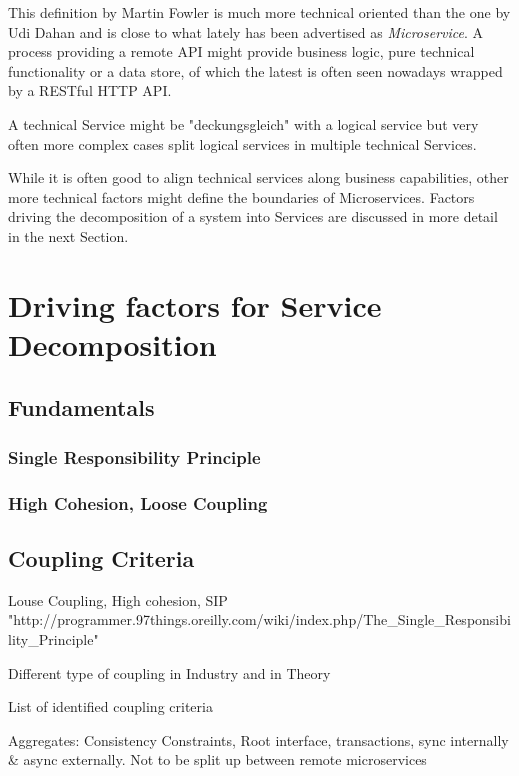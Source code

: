 \documentclass[hsr-ba,english]{hgbthesis}
\begin{document}
This definition by Martin Fowler is much more technical oriented than the one by Udi Dahan and is close to what  lately has been advertised as \textit{Microservice}. A process providing a remote API might provide business logic, pure technical functionality or a data store, of which the latest is often seen nowadays wrapped by a RESTful HTTP API.

A technical Service might be "deckungsgleich" with a logical service but very often more complex cases split logical services in multiple technical Services. 

While it is often good to align technical services along business capabilities, other more technical factors might define the boundaries of Microservices. Factors driving the decomposition of a system into Services are discussed in more detail in the next Section.

\section{Driving factors for Service Decomposition}

\subsection{Fundamentals}

\subsubsection{Single Responsibility Principle}

\subsubsection{High Cohesion, Loose Coupling}

\subsection{Coupling Criteria}

Louse Coupling, High cohesion, SIP
"http://programmer.97things.oreilly.com/wiki/index.php/The\_Single\_Responsibility\_Principle"

Different type of coupling in Industry and in Theory

List of identified coupling criteria

Aggregates: Consistency Constraints, Root interface, transactions, sync internally \& async externally. Not to be split up between remote microservices
\end{document}
